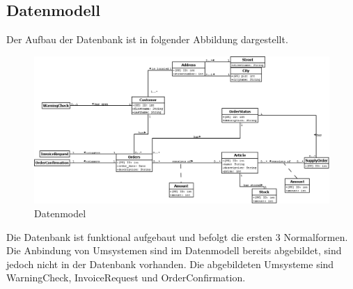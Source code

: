 \subsection{Datenmodell}
Der Aufbau der Datenbank ist in folgender Abbildung dargestellt.
\begin{figure}[H]
	\includegraphics[width=1.0\linewidth]{Images/datamodel}
	\caption{Datenmodel}
	\label{fig:datamodel}
\end{figure}
Die Datenbank ist funktional aufgebaut und befolgt die ersten 3 Normalformen. Die Anbindung von Umsystemen sind im Datenmodell bereits abgebildet, sind jedoch nicht in der Datenbank vorhanden. Die abgebildeten Umsysteme sind WarningCheck, InvoiceRequest und OrderConfirmation.
